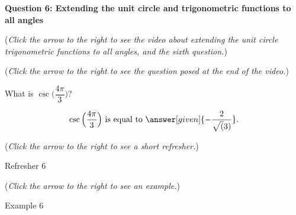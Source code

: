 \documentclass{ximera}
\begin{document}
\textbf{Question 6: Extending the unit circle and trigonometric
functions to all angles}
\begin{question}
\begin{flushright}
{\color{blue}(\emph{Click the arrow to the right to see the
video about extending the unit circle trigonometric functions to all
angles, and the sixth question.})}
\end{flushright}
\begin{center}
\begin{expandable}
{\color{blue}(\emph{Click the arrow to the right to see the question
posed at the end of the video.})}
\begin{expandable}
What is $\csc\Big(\dfrac{4\pi}{3}\Big)$?
\begin{prompt}
\[
\csc\Big( \dfrac{4\pi}{3}\Big) \text{ is equal to } \answer[given]{-\frac{2}{\sqrt(3)}}.
\]
\end{prompt}
\begin{flushright}
{\color{blue}(\emph{Click the arrow to the right to see a short refresher.})}
\end{flushright}
\begin{expandable}
Refresher 6
\end{expandable}
\begin{flushright}
{\color{blue}(\emph{Click the arrow to the right to see an example.})}
\end{flushright}
\begin{expandable}
Example 6
\end{expandable}
\end{expandable}
\end{expandable}
\end{center}
\end{question}
\end{document}
